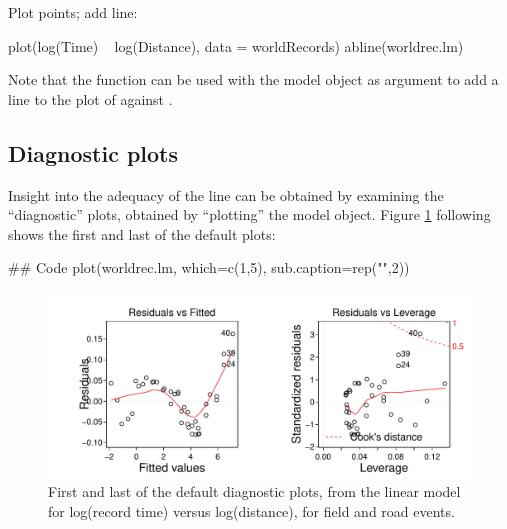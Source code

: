\begin{marginfigure}
Plot points; add line:
\begin{Schunk}
\begin{Sinput}
plot(log(Time) ~ log(Distance),
     data = worldRecords)
abline(worldrec.lm)
\end{Sinput}
\end{Schunk}
\end{marginfigure}
Note that the function  can be used
  with the model object as argument to add a line to the plot of
   against .

\subsection*{Diagnostic plots}

Insight into the adequacy of the line 
can be obtained by examining the
``diagnostic'' plots, obtained by ``plotting'' the model object.
Figure \ref{fig:wr-diag} following shows the first and last of the default
plots:
\begin{Schunk}
\begin{Sinput}
## Code
plot(worldrec.lm, which=c(1,5),
     sub.caption=rep("",2))
\end{Sinput}
\end{Schunk}

\begin{figure}
\begin{Schunk}


\centerline{\includegraphics[width=\textwidth]{figs/03-diag12-1} }

\end{Schunk}
      \caption{First and last of the default diagnostic plots, from the
        linear model for log(record time) versus log(distance), for
        field and road events.}
\label{fig:wr-diag}
\end{figure}


